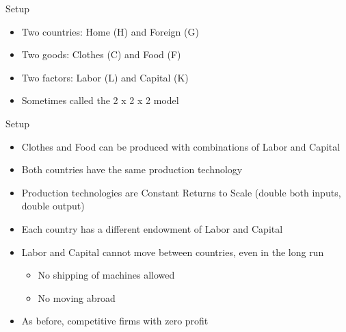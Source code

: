 \documentclass[ignorenonframetext,]{beamer}
\begin{document}
\begin{frame}{Setup}

        \begin{itemize}
            \item Two countries: Home (H) and Foreign (G)
            \item Two goods: Clothes (C) and Food (F)
            \item Two factors: Labor (L) and Capital (K)
            \item Sometimes called the 2 x 2 x 2 model
        \end{itemize}

\end{frame}

\begin{frame}{Setup}

        \begin{itemize}
            \item Clothes and Food can be produced with combinations of Labor and Capital
            \item Both countries have the same production technology 
            \item Production technologies are Constant Returns to Scale (double both inputs, double output)
            \item Each country has a different endowment of Labor and Capital 
            \item Labor and Capital cannot move between countries, even in the long run
            \begin{itemize}
                \item No shipping of machines allowed
                \item No moving abroad
            \end{itemize}
            \item As before, competitive firms with zero profit
        \end{itemize}

\end{frame}
\end{document}
